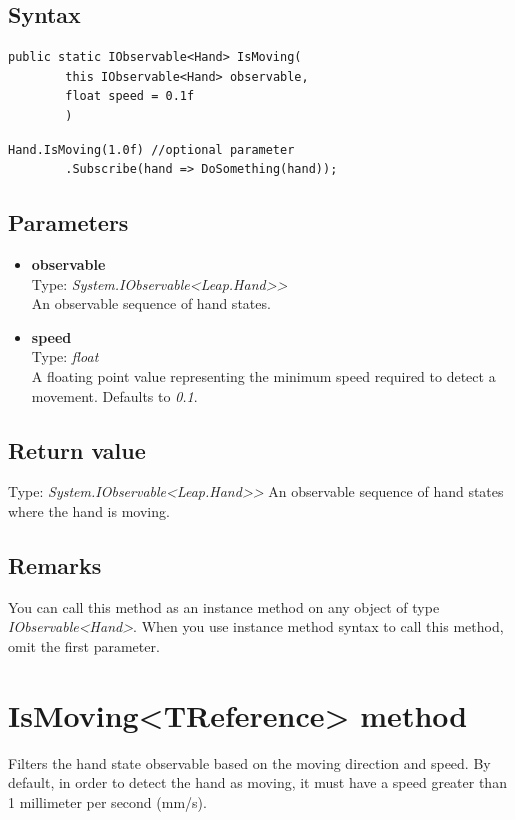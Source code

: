 \documentclass[12pt,a4paper,twoside]{report}
\begin{document}
\subsection{Syntax}
\begin{lstlisting}[caption=Declaration]
    public static IObservable<Hand> IsMoving(
        this IObservable<Hand> observable,
        float speed = 0.1f
        )
\end{lstlisting}

\begin{lstlisting}[caption=Usage example]
    Hand.IsMoving(1.0f) //optional parameter
        .Subscribe(hand => DoSomething(hand));
\end{lstlisting}

\subsection{Parameters}

\begin{itemize}
    \item \textbf{observable}\\
        Type: \textit{System.IObservable<Leap.Hand>{}>}\\
        An observable sequence of hand states.
    \item \textbf{speed}\\
        Type: \textit{float}\\
        A floating point value representing the minimum speed required to detect a movement. Defaults to
        \textit{0.1}.
\end{itemize}

\subsection{Return value}
Type: \textit{System.IObservable<Leap.Hand>{}>}
An observable sequence of hand states where the hand is moving.

\subsection{Remarks}
You can call this method as an instance method on any object of type \textit{IObservable<Hand>}. When you use instance method syntax to call this method, omit the first parameter.

\newpage

\section{IsMoving<TReference> method}
Filters the hand state observable based on the moving direction and speed. By default, in order to detect the hand as moving, it must have a speed greater than 1 millimeter per second (mm/s).
\end{document}
